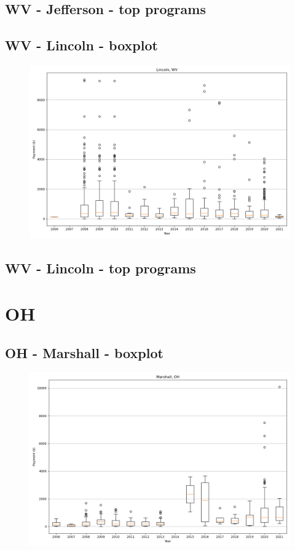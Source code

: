 \subsection*{WV - Jefferson - top programs}

\newpage
\subsection*{WV - Lincoln - boxplot}
\begin{figure}[h]
\centering
\includegraphics[width=7in]{../output/boxplots/counties/Lincoln-WV_boxplot.png}
\end{figure}


\subsection*{WV - Lincoln - top programs}

\newpage
\section*{OH}
\subsection*{OH - Marshall - boxplot}
\begin{figure}[h]
\centering
\includegraphics[width=7in]{../output/boxplots/counties/Marshall-OH_boxplot.png}
\end{figure}


